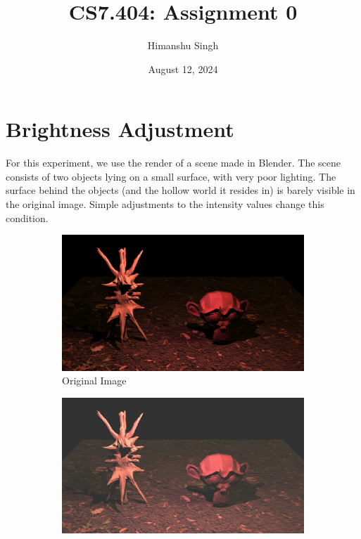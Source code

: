 \documentclass[a4paper]{article}
\title{CS7.404: Assignment 0}
\author{Himanshu Singh}
\date{August 12, 2024}
\begin{document}
\maketitle

\section{Brightness Adjustment}

For this experiment, we use the render of a scene made in Blender. The scene consists of two objects lying on a small surface, with very poor lighting. The surface behind the objects (and the hollow world it resides in) is barely visible in the original image. Simple adjustments to the intensity values change this condition.

\begin{figure}[H]
    \hfill
    \centering
    \begin{subfigure}[b]{.3\textwidth}
        \centering
        \includegraphics[width=\textwidth]{media/monkey.png}
        \caption{Original Image}
    \end{subfigure}
    \hfill
    \begin{subfigure}[b]{.3\textwidth}
        \centering
        \includegraphics[width=\textwidth]{output/monkey_added_brightness.jpg}

\end{subfigure}
\end{figure}
\end{document}
